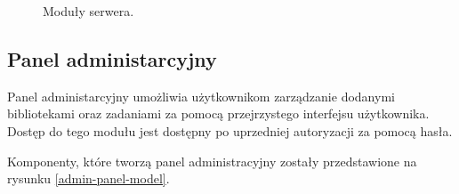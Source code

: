 \documentclass[a4paper,11pt,twoside]{report}
\theoremstyle{definition}
\begin{document}
\begin{figure}[ht] 
	\caption{Moduły serwera.}
	\label{server-model}
\end{figure}

\subsection{Panel administarcyjny}

Panel administarcyjny umożliwia użytkownikom zarządzanie dodanymi bibliotekami oraz zadaniami za pomocą przejrzystego interfejsu użytkownika. Dostęp do tego modułu jest dostępny po uprzedniej autoryzacji za pomocą hasła. 

Komponenty, które tworzą panel administracyjny zostały przedstawione na rysunku \ref{admin-panel-model}. 
\end{document}
